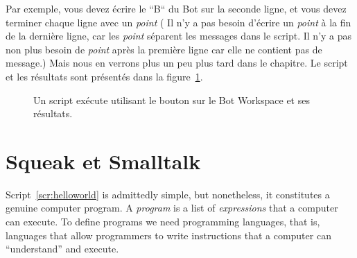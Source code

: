 \documentclass[a4paper,10pt,twoside]{book}
\begin{document}
Par exemple, vous devez \'ecrire le ``B`` du Bot sur la seconde ligne, et vous devez terminer chaque ligne avec un \emph{point} ( Il n'y a pas besoin d'\'ecrire un \emph{point} \`a la fin de la derni\`ere ligne, car les \emph{point} s\'eparent les messages dans le script. Il n'y a pas non plus besoin de \emph{point} apr\`es la premi\`ere ligne car elle ne contient pas de message.) Mais nous en verrons plus un peu plus tard dans le chapitre. Le script et les r\'esultats sont pr\'esent\'es dans la figure~\ref{fig:doit}.


\begin{figure}[!h]
\caption{Un script ex\'ecute utilisant le bouton  sur le Bot Workspace et ses r\'esultats.
\label{fig:doit}}
\end{figure}


\section{Squeak et Smalltalk}
Script~\ref{scr:helloworld} is admittedly simple, but nonetheless, it constitutes a genuine computer program. A \emph{program} is a list of \emph{expressions} that a computer can execute. To define programs we need programming languages, that is, languages that allow programmers to write instructions that a computer can ``understand'' and execute. 
\end{document}
